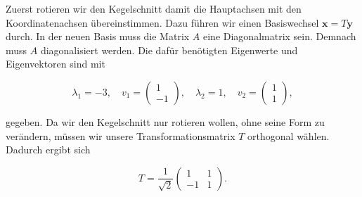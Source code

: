 \begin{figure}[h]
    \centering
\end{figure}

Zuerst rotieren wir den Kegelschnitt damit die Hauptachsen mit den Koordinatenachsen übereinstimmen. Dazu führen wir einen Basiswechsel \( \mathbf{x} = T \mathbf{y} \) durch. In der neuen Basis muss die Matrix \( A \) eine Diagonalmatrix sein. Demnach muss \( A \) diagonalisiert werden. Die dafür benötigten Eigenwerte und Eigenvektoren sind mit 

\begin{equation*}
    \lambda_1 = -3, \quad v_1 = \begin{pmatrix} 1 \\ -1 \end{pmatrix}, \quad \lambda_2 = 1, \quad v_2 = \begin{pmatrix} 1 \\ 1 \end{pmatrix},
\end{equation*}

gegeben. Da wir den Kegelschnitt nur rotieren wollen, ohne seine Form zu verändern, müssen wir unsere Transformationsmatrix \( T \) orthogonal wählen. Dadurch ergibt sich 

\begin{equation*}
    T = \frac{1}{\sqrt{2}} \begin{pmatrix}
        1 & 1 \\
        -1 & 1
    \end{pmatrix}.
\end{equation*}

